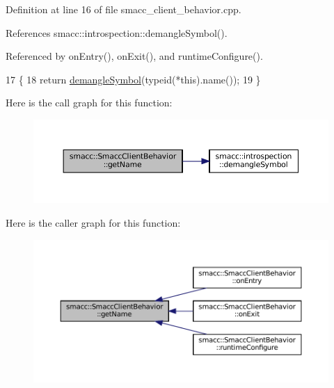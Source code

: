 Definition at line 16 of file smacc\+\_\+client\+\_\+behavior.\+cpp.



References smacc\+::introspection\+::demangle\+Symbol().



Referenced by on\+Entry(), on\+Exit(), and runtime\+Configure().


\begin{DoxyCode}
17     \{
18         \textcolor{keywordflow}{return} \hyperlink{namespacesmacc_1_1introspection_a2f495108db3e57604d8d3ff5ef030302}{demangleSymbol}(\textcolor{keyword}{typeid}(*this).name());
19     \}
\end{DoxyCode}
Here is the call graph for this function\+:
\nopagebreak
\begin{figure}[H]
\begin{center}
\leavevmode
\includegraphics[width=350pt]{classsmacc_1_1SmaccClientBehavior_ada2ec9b296106de2261d13ef22caf81c_cgraph}
\end{center}
\end{figure}
Here is the caller graph for this function\+:
\nopagebreak
\begin{figure}[H]
\begin{center}
\leavevmode
\includegraphics[width=350pt]{classsmacc_1_1SmaccClientBehavior_ada2ec9b296106de2261d13ef22caf81c_icgraph}
\end{center}
\end{figure}
\mbox{\label{classsmacc_1_1SmaccClientBehavior_aa817da149f366f6a28794c04eb0744b0}} 
